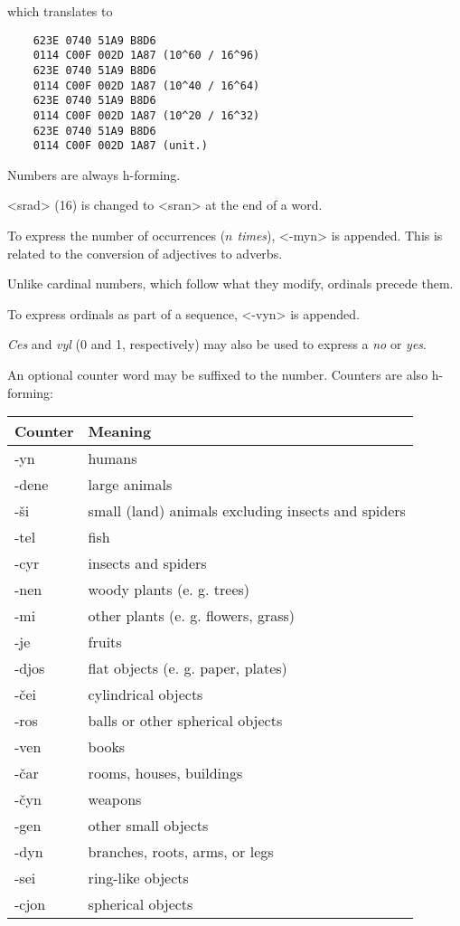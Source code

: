 \documentclass{book}
\begin{document}
which translates to

\begin{verbatim}
	623E 0740 51A9 B8D6
	0114 C00F 002D 1A87 (10^60 / 16^96)
	623E 0740 51A9 B8D6
	0114 C00F 002D 1A87 (10^40 / 16^64)
	623E 0740 51A9 B8D6
	0114 C00F 002D 1A87 (10^20 / 16^32)
	623E 0740 51A9 B8D6
	0114 C00F 002D 1A87 (unit.)
\end{verbatim}

Numbers are always h-forming.

<srad> (16) is changed to <sran> at the end of a word.

To express the number of occurrences (\emph{$n$ times}), <-myn> is appended. This is related to the conversion of adjectives to adverbs.


Unlike cardinal numbers, which follow what they modify, ordinals precede them.

To express ordinals as part of a sequence, <-vyn> is appended.


\emph{Ces} and \emph{vyl} (0 and 1, respectively) may also be used to express a \emph{no} or \emph{yes}.

An optional counter word may be suffixed to the number. Counters are also h-forming:

\begin{center}
	\begin{tabular}{|l|l|}
	  \hline
	  Counter & Meaning \\ \hline
	  -yn & humans \\
	  -dene & large animals \\
	  -ši & small (land) animals excluding insects and spiders \\
	  -tel & fish \\
	  -cyr & insects and spiders \\
	  -nen & woody plants (e. g. trees) \\
	  -mi & other plants (e. g. flowers, grass) \\
	  -je & fruits \\
	  -djos & flat objects (e. g. paper, plates) \\
	  -čei & cylindrical objects \\
	  -ros & balls or other spherical objects \\
	  -ven & books \\
	  -čar & rooms, houses, buildings \\
	  -čyn & weapons \\
	  -gen & other small objects \\
	  -dyn & branches, roots, arms, or legs \\
	  -sei & ring-like objects \\
	  -cjon & spherical objects \\ \hline
	\end{tabular}
\end{center}
\end{document}
